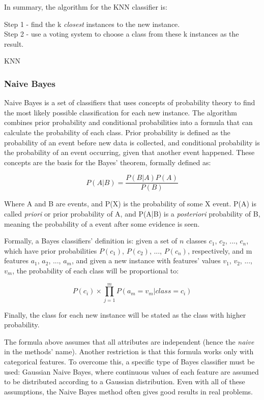 In summary, the algorithm for the KNN classifier is:

\begin{algorithm}[H]
Step 1 - find the k \emph{closest} instances to the new instance. \\
Step 2 - use a voting system to choose a class from these k instances as the result.
\caption{KNN}
\end{algorithm}

\subsubsection{Naive Bayes}

Naive Bayes is a set of classifiers that uses concepts of probability theory to find the most likely possible classification for each new instance. The algorithm combines prior probability and conditional probabilities into a formula that can calculate the probability of each class. Prior probability is defined as the probability of an event before new data is collected, and conditional probability is the probability of an event occurring, given that another event happened. These concepts are the basis for the Bayes' theorem, formally defined as:

\begin{equation} P(A|B) = \frac{P(B|A)P(A)}{P(B)} \end{equation}

Where A and B are events, and P(X) is the probability of some X event. P(A) is called \emph{priori} or prior probability of A, and P(A|B) is a \emph{posteriori} probability of B, meaning the probability of a event after some evidence is seen.

Formally, a Bayes classifiers' definition is: given a set of $n$ classes $c_1$, $c_2$, ..., $c_n$, which have prior probabilities $P(c_1)$, $P(c_2)$, ..., $P(c_n)$, respectively, and m features $a_1$, $a_2$, ..., $a_m$, and given a new instance with features' values $v_1$, $v_2$, ..., $v_m$, the probability of each class will be proportional to:

\begin{equation} P(c_i) \times \prod_{j=1}^m P(a_m=v_m | class = c_i) \end{equation}

Finally, the class for each new instance will be stated as the class with higher probability.

The formula above assumes that all attributes are independent (hence the \emph{naive} in the methods' name). Another restriction is that this formula works only with categorical features. To overcome this, a specific type of Bayes classifier must be used: Gaussian Naive Bayes, where continuous values of each feature are assumed to be distributed according to a Gaussian distribution. Even with all of these assumptions, the Naive Bayes method often gives good results in real problems.

